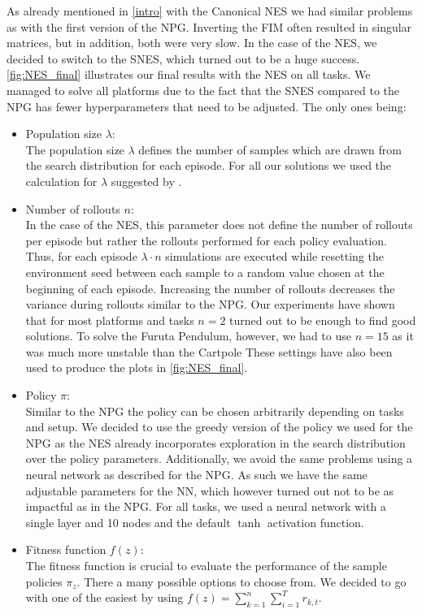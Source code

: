 As already mentioned in \autoref{intro} with the Canonical NES we had similar problems as with the first version of the NPG. Inverting the FIM often resulted in singular matrices, but in addition, both were very slow. In the case of the NES, we decided to switch to the SNES, which turned out to be a huge success. \autoref{fig:NES_final} illustrates our final results with the NES on all tasks. We managed to solve all platforms due to the fact that the SNES compared to the NPG has fewer hyperparameters that need to be adjusted. The only ones being:
\begin{itemize}
  \item Population size $\lambda$: \\
  The population size $\lambda$ defines the number of samples which are drawn from the search distribution for each episode. For all our solutions we used the calculation for $\lambda$ suggested by \cite{Wierstra14}. \smallskip
  \item Number of rollouts $n$: \\
  In the case of the NES, this parameter does not define the number of rollouts per episode but rather the rollouts performed for each policy evaluation. Thus, for each episode $\lambda \cdot n$ simulations are executed while resetting the environment seed between each sample to a random value chosen at the beginning of each episode. Increasing the number of rollouts decreases the variance during rollouts similar to the NPG. Our experiments have shown that for most platforms and tasks $n=2$ turned out to be enough to find good solutions. To solve the Furuta Pendulum, however, we had to use $n=15$ as it was much more unstable than the Cartpole These settings have also been used to produce the plots in \autoref{fig:NES_final}. \smallskip
  \item Policy $\pi$: \\
  Similar to the NPG the policy can be chosen arbitrarily depending on tasks and setup. We decided to use the greedy version of the policy we used for the NPG as the NES already incorporates exploration in the search distribution over the policy parameters. Additionally, we avoid the same problems using a neural network as described for the NPG. As such we have the same adjustable parameters for the NN, which however turned out not to be as impactful as in the NPG. For all tasks, we used a neural network with a single layer and 10 nodes and the default $\tanh$ activation function. \smallskip
  \item Fitness function $f(z)$: \\
  The fitness function is crucial to evaluate the performance of the sample policies $\pi_z$. There a many possible options to choose from. We decided to go with one of the easiest by using $f(z) = \sum_{k=1}^{n} \sum_{i=1}^{T} r_{k,t}$.
\end{itemize}

